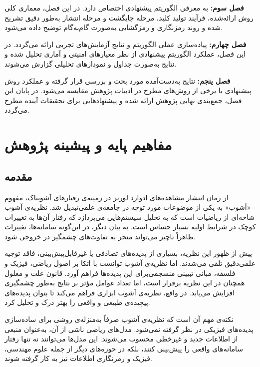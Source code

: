 \documentclass[a4paper,12pt]{report}
\renewcommand{\%}{\lr{\oldpercent}}
\begin{document}
\textbf{فصل سوم:} به معرفی الگوریتم پیشنهادی اختصاص دارد. در این فصل، معماری کلی روش ارائه‌شده، فرآیند تولید کلید، مرحله جایگشت و مرحله انتشار به‌طور دقیق تشریح شده و روند رمزنگاری و رمزگشایی به‌صورت گام‌به‌گام توضیح داده می‌شود.

\textbf{فصل چهارم:} پیاده‌سازی عملی الگوریتم و نتایج آزمایش‌های تجربی ارائه می‌گردد. در این فصل، عملکرد الگوریتم پیشنهادی از نظر معیارهای امنیتی و آماری تحلیل شده و نتایج به‌صورت جداول و نمودارهای تحلیلی گزارش می‌شوند.

\textbf{فصل پنجم:} نتایج به‌دست‌آمده مورد بحث و بررسی قرار گرفته و عملکرد روش پیشنهادی با برخی از روش‌های مطرح در ادبیات پژوهش مقایسه می‌شود. در پایان این فصل، جمع‌بندی نهایی پژوهش ارائه شده و پیشنهادهایی برای تحقیقات آینده مطرح می‌گردد.

\newpage

\chapter{مفاهیم پایه و پیشینه پژوهش}

\section{مقدمه}
از زمان انتشار مشاهده‌های ادوارد لورنز در زمینه‌ی رفتارهای آشوبناک، مفهوم «آشوب» به یکی از موضوعات مورد توجه در جامعه‌ی علمی‌تبدیل شد. نظریه‌ی آشوب شاخه‌ای از ریاضیات است که به تحلیل سیستم‌هایی می‌پردازد که رفتار آن‌ها به تغییرات کوچک در شرایط اولیه بسیار حساس است. به بیان دیگر، در این‌گونه سامانه‌ها، تغییرات ظاهراً ناچیز می‌تواند منجر به تفاوت‌های چشمگیر در خروجی شود.

پیش از ظهور این نظریه، بسیاری از پدیده‌های تصادفی یا غیرقابل‌پیش‌بینی، فاقد توجیه علمی‌دقیق تلقی می‌شدند. اما نظریه‌ی آشوب توانست با اتکا بر اصول ریاضی، فیزیک و فلسفه، مبانی تبیینی منسجمی‌برای این پدیده‌ها فراهم آورد. قانون علت و معلول همچنان در این نظریه برقرار است، اما تعداد عوامل مؤثر بر نتایج به‌طور چشمگیری افزایش می‌یابد. در واقع، نظریه‌ی آشوب ابزاری فراهم می‌کند تا بتوان پدیده‌های پیچیده‌ی طبیعی و واقعی را بهتر درک و تحلیل کرد.

نکته‌ی مهم آن است که نظریه‌ی آشوب صرفاً به‌منزله‌ی روشی برای ساده‌سازی پدیده‌های فیزیکی در نظر گرفته نمی‌شود. مدل‌های ریاضی ناشی از آن، به‌عنوان منبعی از اطلاعات جدید و غیرخطی محسوب می‌شوند. این مدل‌ها می‌توانند نه تنها رفتار سامانه‌های واقعی را پیش‌بینی کنند، بلکه در حوزه‌های دیگر از جمله علوم مهندسی، فیزیک و رمزنگاری اطلاعات نیز به کار گرفته شوند.
\end{document}
